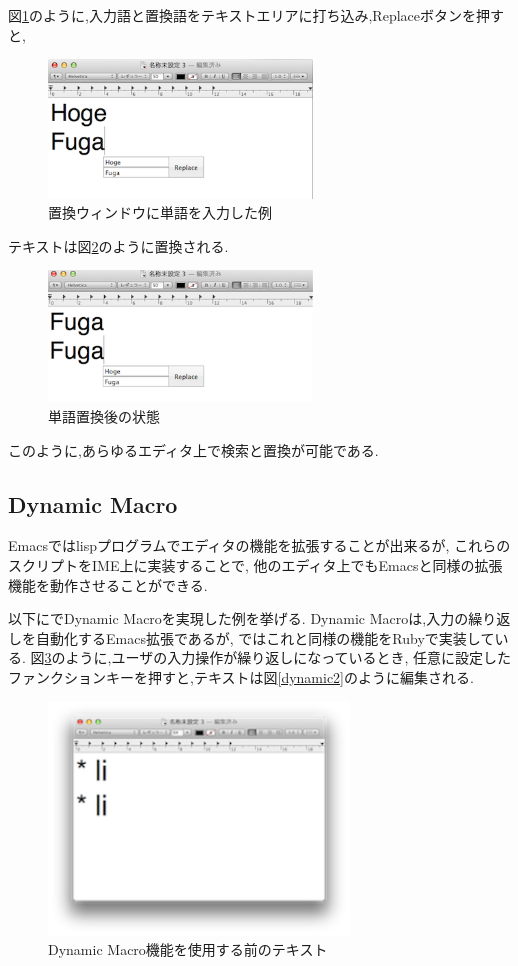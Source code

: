図\ref{search2}のように,入力語と置換語をテキストエリアに打ち込み,Replaceボタンを押すと,

\begin{figure}[H]
\centerline{\includegraphics[width=70mm,bb=0 0 360 191]{figures/replace2.png}}
\caption{置換ウィンドウに単語を入力した例}
\label{search2}
\end{figure}


テキストは図\ref{search3}のように置換される.

\begin{figure}[H]
\centerline{\includegraphics[width=70mm,bb=0 0 360 191]{figures/replace3.png}}
\caption{単語置換後の状態}
\label{search3}
\end{figure}

このように,あらゆるエディタ上で検索と置換が可能である.

\subsection{Dynamic Macro}

Emacsではlispプログラムでエディタの機能を拡張することが出来るが,
これらのスクリプトをIME上に実装することで,
他のエディタ上でもEmacsと同様の拡張機能を動作させることができる.

以下に{\system}でDynamic Macro\cite{DynamicMacro}を実現した例を挙げる.
Dynamic Macroは,入力の繰り返しを自動化するEmacs拡張であるが,
{\system}ではこれと同様の機能をRubyで実装している.
図\ref{dynamic1}のように,ユーザの入力操作が繰り返しになっているとき,
任意に設定したファンクションキーを押すと,テキストは図\ref{dynamic2}のように編集される.

\begin{figure}[H]
\centerline{\includegraphics[width=80mm,bb=0 0 360 220]{figures/dynamic1.png}}
\caption{Dynamic Macro機能を使用する前のテキスト}
\label{dynamic1}
\end{figure}

